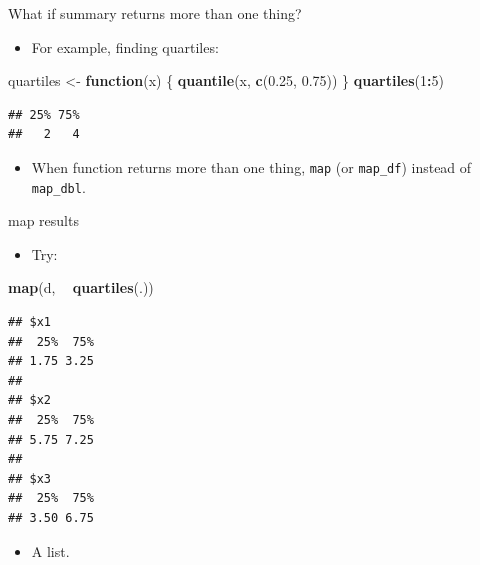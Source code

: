 \documentclass[ignorenonframetext,]{beamer}
\newenvironment{Shaded}{\begin{snugshade}}{\end{snugshade}}
\newcommand{\ControlFlowTok}[1]{\textcolor[rgb]{0.13,0.29,0.53}{\textbf{#1}}}
\newcommand{\DecValTok}[1]{\textcolor[rgb]{0.00,0.00,0.81}{#1}}
\newcommand{\FloatTok}[1]{\textcolor[rgb]{0.00,0.00,0.81}{#1}}
\newcommand{\KeywordTok}[1]{\textcolor[rgb]{0.13,0.29,0.53}{\textbf{#1}}}
\newcommand{\NormalTok}[1]{#1}
\newcommand{\OperatorTok}[1]{\textcolor[rgb]{0.81,0.36,0.00}{\textbf{#1}}}
\newcommand{\StringTok}[1]{\textcolor[rgb]{0.31,0.60,0.02}{#1}}
\providecommand{\tightlist}{%
  \setlength{\itemsep}{0pt}\setlength{\parskip}{0pt}}
\begin{document}
\begin{frame}[fragile]{What if summary returns more than one thing?}
\protect\hypertarget{what-if-summary-returns-more-than-one-thing}{}

\begin{itemize}
\tightlist
\item
  For example, finding quartiles:
\end{itemize}

\begin{Shaded}
\begin{Highlighting}[]
\NormalTok{quartiles <-}\StringTok{ }\ControlFlowTok{function}\NormalTok{(x) \{}
  \KeywordTok{quantile}\NormalTok{(x, }\KeywordTok{c}\NormalTok{(}\FloatTok{0.25}\NormalTok{, }\FloatTok{0.75}\NormalTok{))}
\NormalTok{\}}
\KeywordTok{quartiles}\NormalTok{(}\DecValTok{1}\OperatorTok{:}\DecValTok{5}\NormalTok{)}
\end{Highlighting}
\end{Shaded}

\begin{verbatim}
## 25% 75% 
##   2   4
\end{verbatim}

\begin{itemize}
\tightlist
\item
  When function returns more than one thing, \texttt{map} (or
  \texttt{map\_df}) instead of \texttt{map\_dbl}.
\end{itemize}

\end{frame}

\begin{frame}[fragile]{map results}
\protect\hypertarget{map-results}{}

\begin{itemize}
\tightlist
\item
  Try:
\end{itemize}

\begin{Shaded}
\begin{Highlighting}[]
\KeywordTok{map}\NormalTok{(d, }\OperatorTok{~}\StringTok{ }\KeywordTok{quartiles}\NormalTok{(.))}
\end{Highlighting}
\end{Shaded}

\begin{verbatim}
## $x1
##  25%  75% 
## 1.75 3.25 
## 
## $x2
##  25%  75% 
## 5.75 7.25 
## 
## $x3
##  25%  75% 
## 3.50 6.75
\end{verbatim}

\begin{itemize}
\tightlist
\item
  A list.
\end{itemize}

\end{frame}
\end{document}
